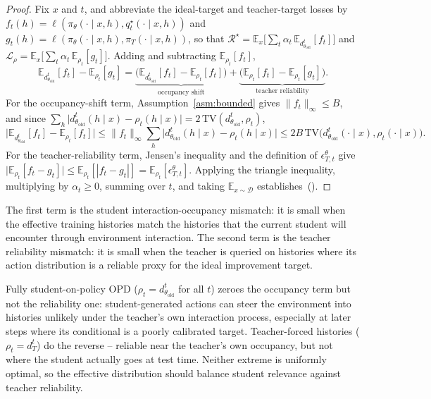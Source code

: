 \begin{proof}
Fix \(x\) and \(t\), and abbreviate the ideal-target and teacher-target losses by
\(f_t(h)=\ell(\pi_\theta(\cdot\mid x,h),q_t^\star(\cdot\mid x,h))\) and
\(g_t(h)=\ell(\pi_\theta(\cdot\mid x,h),\pi_T(\cdot\mid x,h))\), so that
\(\mathcal R^\star=\mathbb E_{x}\bigl[\sum_t\alpha_t\,\mathbb E_{d_{\theta_{\mathrm{old}}}^{t}}[f_t]\bigr]\)
and \(\mathcal L_\rho=\mathbb E_{x}\bigl[\sum_t\alpha_t\,\mathbb E_{\rho_t}[g_t]\bigr]\).
Adding and subtracting \(\mathbb E_{\rho_t}[f_t]\),
\[
\mathbb E_{d_{\theta_{\mathrm{old}}}^{t}}[f_t]-\mathbb E_{\rho_t}[g_t]
=
\underbrace{\bigl(\mathbb E_{d_{\theta_{\mathrm{old}}}^{t}}[f_t]-\mathbb E_{\rho_t}[f_t]\bigr)}_{\text{occupancy shift}}
+
\underbrace{\bigl(\mathbb E_{\rho_t}[f_t]-\mathbb E_{\rho_t}[g_t]\bigr)}_{\text{teacher reliability}}.
\]
For the occupancy-shift term, Assumption~\ref{asm:bounded} gives
\(\|f_t\|_\infty\le B\), and since
\(\sum_h\bigl|d_{\theta_{\mathrm{old}}}^{t}(h\mid x)-\rho_t(h\mid x)\bigr|=2\,\mathrm{TV}(d_{\theta_{\mathrm{old}}}^{t},\rho_t)\),
\[
\bigl|\mathbb E_{d_{\theta_{\mathrm{old}}}^{t}}[f_t]-\mathbb E_{\rho_t}[f_t]\bigr|
\le
\|f_t\|_\infty\sum_h\bigl|d_{\theta_{\mathrm{old}}}^{t}(h\mid x)-\rho_t(h\mid x)\bigr|
\le
2B\,\mathrm{TV}\bigl(d_{\theta_{\mathrm{old}}}^{t}(\cdot\mid x),\rho_t(\cdot\mid x)\bigr).
\]
For the teacher-reliability term, Jensen's inequality and the definition of
\(\epsilon_{T,t}^{\theta}\) give
\(\bigl|\mathbb E_{\rho_t}[f_t-g_t]\bigr|\le\mathbb E_{\rho_t}[|f_t-g_t|]=\mathbb E_{\rho_t}[\epsilon_{T,t}^{\theta}]\).
Applying the triangle inequality, multiplying by \(\alpha_t\ge0\), summing over \(t\),
and taking \(\mathbb E_{x\sim\mathcal D}\) establishes~().
\end{proof}
The first term is the student interaction-occupancy mismatch: it is small when the
effective training histories match the histories that the current student will
encounter through environment interaction. The second term is the teacher
reliability mismatch: it is small when the teacher is queried on histories where its
action distribution is a reliable proxy for the ideal improvement target.

Fully student-on-policy OPD (\(\rho_t=d_{\theta_{\mathrm{old}}}^{t}\) for all \(t\))
zeroes the occupancy term but not the reliability one: student-generated actions can
steer the environment into histories unlikely under the teacher's own interaction
process, especially at later steps where its conditional is a poorly calibrated
target. Teacher-forced histories (\(\rho_t=d_T^{t}\)) do the reverse -- reliable near
the teacher's own occupancy, but not where the student actually goes at test time.
Neither extreme is uniformly optimal, so the effective distribution should balance
student relevance against teacher reliability.

